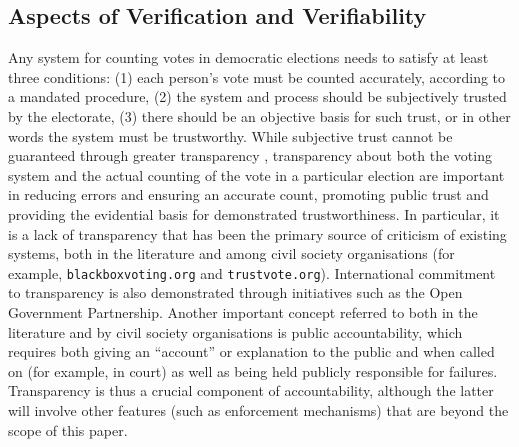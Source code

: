    
   
\subsection{Aspects of Verification and Verifiability}
Any system for counting votes in democratic elections needs to
satisfy at least three conditions: (1) each person's vote must be
counted accurately, according to a mandated procedure, (2) the
system and process should be subjectively trusted by the electorate,
(3) there should be an objective basis for such trust, or in other
words the system must be trustworthy. While subjective trust cannot
be guaranteed through greater transparency \citep{ONeill:2002:QT}, transparency about
both the voting system and the actual counting of the vote in a
particular election are important in reducing errors and ensuring an
accurate count, promoting public trust and providing the evidential
basis for demonstrated trustworthiness. In particular, it is a lack
of transparency that has been the primary source of criticism of
existing systems, both in the literature
\citep{Carrier:2012:VCT,Conway:2017:ANS} and among civil
society organisations \citep{Vogl:2012:WWC} (for example,
\texttt{blackboxvoting.org} and
\texttt{trustvote.org}). International commitment to transparency is also
demonstrated through initiatives such as the Open Government
Partnership. Another important concept referred to both in the
literature and by civil society organisations is public
accountability, which requires both giving an “account” or
explanation to the public and when called on (for example, in court)
as well as being held publicly responsible for failures.
Transparency is thus a crucial component of accountability, although
the latter will involve other features (such as enforcement
mechanisms) that are beyond the scope of this paper. 


